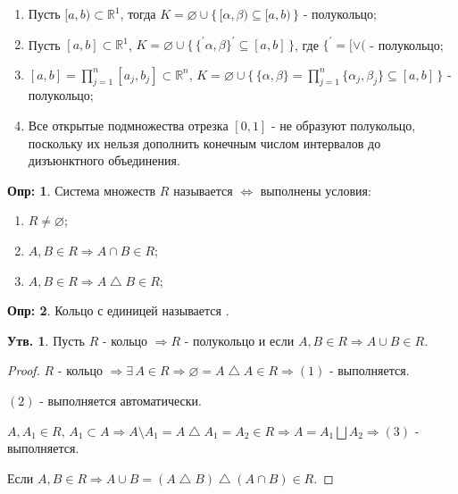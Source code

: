 \documentclass[12pt]{article}
\theoremstyle{definition}
\newtheorem{defn}{Опр:}
\newtheorem{prop}{Утв.}
\begin{document}
\begin{enumerate}
	\item Пусть $[a,b) \subset \mathbb{R}^1$, тогда $K = \varnothing \cup \{\,[\alpha, \beta) \subseteq [a,b) \,\}$ - полукольцо;
	\item Пусть $[a,b] \subset \mathbb{R}^1$, $K = \varnothing \cup \{\,\{^\prime\alpha, \beta\}^\prime \subseteq [a,b] \,\}$, где $\{^\prime = [ \vee ($ - полукольцо;
	\item $[a,b] = \prod\limits_{j=1}^{n}[a_j, b_j] \subset \mathbb{R}^n$, $K = \varnothing \cup \{\,\{\alpha, \beta\} = \prod\limits_{j=1}^{n}\{\alpha_j, \beta_j\} \subseteq [a,b] \,\}$ - полукольцо;
	\item Все открытые подмножества отрезка $[0,1]$ - не образуют полукольцо, поскольку их нельзя дополнить конечным числом интервалов до дизъюнктного объединения.
\end{enumerate}

\begin{defn}
	Система множеств $R$ называется  $\Leftrightarrow$ выполнены условия:
	\begin{enumerate}[label={(\arabic*)}]
		\item $R \neq \varnothing$;
		\item $A, B \in R \Rightarrow A \cap B \in R$;
		\item $A, B \in R \Rightarrow A \bigtriangleup B \in R $;
	\end{enumerate}
\end{defn}

\begin{defn}
	Кольцо с единицей называется .
\end{defn}


\begin{prop}
	Пусть $R$ - кольцо $\Rightarrow R$ - полукольцо и если $A, B \in R \Rightarrow A \cup B \in R$.
\end{prop}

\begin{proof}
	$R$ - кольцо $\Rightarrow \exists \, A \in R \Rightarrow \varnothing = A \bigtriangleup A \in R \Rightarrow (1)$ - выполняется.
	
	$(2)$ - выполняется автоматически. 
	
	$A, A_1 \in R, \, A_1 \subset A \Rightarrow A \setminus A_1 = A \bigtriangleup A_1 = A_2 \in R \Rightarrow A = A_1 \bigsqcup A_2 \Rightarrow (3)$ - выполняется.
	
	Если $A, B \in R \Rightarrow A\cup B = (A \bigtriangleup B) \bigtriangleup (A \cap B) \in R$.
\end{proof}
\end{document}
